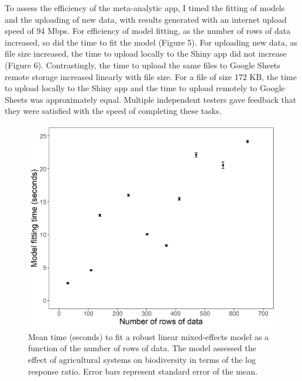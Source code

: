 \documentclass[11pt]{article}
\begin{document}
		\noindent To assess the efficiency of the meta-analytic app, I timed the fitting of models and the uploading of new data, with results generated with an internet upload speed of 94 Mbps. For efficiency of model fitting, as the number of rows of data increased, so did the time to fit the model (Figure 5). For uploading new data, as file size increased, the time to upload locally to the Shiny app did not increase (Figure 6). Contrastingly, the time to upload the same files to Google Sheets remote storage increased linearly with file size. For a file of size 172 KB, the time to upload locally to the Shiny app and the time to upload remotely to Google Sheets was approximately equal. Multiple independent testers gave feedback that they were satisfied with the speed of completing these tasks.  
		
		\begin{figure}[H] 
			\centering 
			\includegraphics[scale=1]{figure_5_model_time_graph.png} 
			\caption{Mean time (seconds) to fit a robust linear mixed-effects model as a function of the number of rows of data. The model assessed the effect of agricultural systems on biodiversity in terms of the log response ratio. Error bars represent standard error of the mean.}  
		\end{figure}
		
\end{document}
